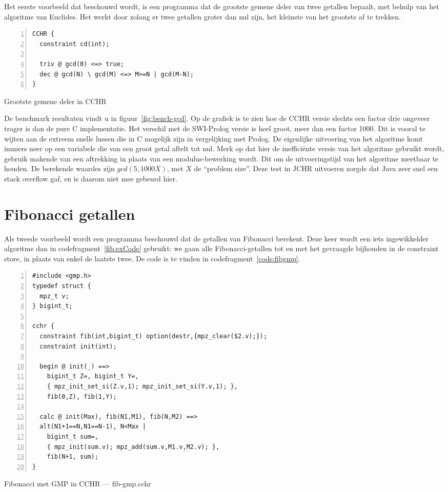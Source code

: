 Het eerste voorbeeld dat beschouwd wordt, is een programma dat de grootste gemene deler van twee getallen bepaalt, met behulp van het algoritme van Euclides. Het werkt door zolang er twee getallen groter dan nul zijn, het kleinste van het grootste af te trekken. 
\begin{exCode}
\begin{Verbatim}[frame=single,numbers=left]
CCHR {
  constraint cd(int);

  triv @ gcd(0) <=> true;
  dec @ gcd(N) \ gcd(M) <=> M>=N | gcd(M-N);
}
\end{Verbatim}
\caption{\label{code:gcd} Grootste gemene deler in CCHR}
\end{exCode}
De benchmark resultaten vindt u in figuur~\ref{fig:bench-gcd}. Op de grafiek is te zien hoe de CCHR versie slechts een factor drie ongeveer trager is dan de pure C implementatie. Het verschil met de SWI-Prolog versie is heel groot, meer dan een factor 1000. Dit is vooral te wijten aan de extreem snelle lussen die in C mogelijk zijn in vergelijking met Prolog. De eigenlijke uitvoering van het algoritme komt immers neer op een variabele die van een groot getal aftelt tot nul. Merk op dat hier de ineffici\"ente versie van het algoritme gebruikt wordt, gebruik makende van een aftrekking in plaats van een modulus-bewerking wordt. Dit om de uitvoeringstijd van het algoritme meetbaar te houden. De berekende waardes zijn $gcd(5,1000 X)$, met $X$ de ``problem size''. Deze test in JCHR uitvoeren zorgde dat Java zeer snel een stack overflow gaf, en is daarom niet mee gebeurd hier.

\section{Fibonacci getallen} \label{sec:bench-fib}

Als tweede voorbeeld wordt een programma beschouwd dat de getallen van Fibonacci berekent. Deze keer wordt een iets ingewikkelder algoritme dan in codefragment~\ref{fib:exCode} gebruikt: we gaan alle Fibonacci-getallen tot en met het gevraagde bijhouden in de constraint store, in plaats van enkel de laatste twee. De code is te vinden in codefragment~\ref{code:fibgmp}.
\begin{exCode}
\begin{Verbatim}[frame=single,numbers=left]
#include <gmp.h>
typedef struct {
  mpz_t v;
} bigint_t;

cchr {
  constraint fib(int,bigint_t) option(destr,{mpz_clear($2.v);});
  constraint init(int);
  
  begin @ init(_) ==> 
    bigint_t Z=, bigint_t Y=, 
    { mpz_init_set_si(Z.v,1); mpz_init_set_si(Y.v,1); },
    fib(0,Z), fib(1,Y);

  calc @ init(Max), fib(N1,M1), fib(N,M2) ==>
  alt(N1+1==N,N1==N-1), N<Max |
    bigint_t sum=,
    { mpz_init(sum.v); mpz_add(sum.v,M1.v,M2.v); },
    fib(N+1, sum);
}
\end{Verbatim}
\caption{\label{code:fibgmp} Fibonacci met GMP in CCHR --- fib-gmp.cchr}
\end{exCode}

